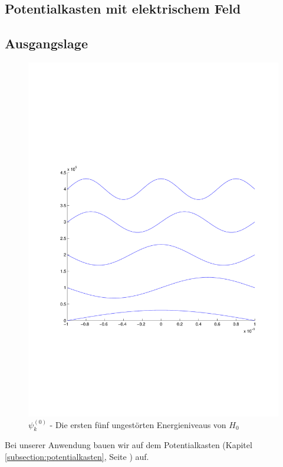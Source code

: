 \begin{refsection}
\section{Potentialkasten mit elektrischem Feld}

\subsection{Ausgangslage}

\begin{figure}
 \centering
 \includegraphics[width=12cm,clip=true,trim=2cm 7cm 1cm 8cm]{efeld/Psi_ungestoert.pdf}
 \caption{$\psi_k^{(0)}$ - Die ersten f\"unf ungest\"orten Energieniveaus von $H_0$ }
 \label{abb:efeld_psi_ungestoert}
\end{figure}

Bei unserer Anwendung bauen wir auf dem Potentialkasten (Kapitel \ref{subsection:potentialkasten}, Seite \pageref{subsection:potentialkasten}) auf.


\end{refsection}
